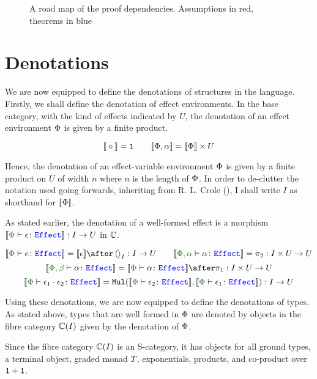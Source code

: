 \documentclass{Report}
\begin{document}
\begin{figure}[h!]
\begin{center}
{
    }
    \end{center}
\caption{A road map of the proof dependencies. Assumptions in red, theorems in blue}
\label{RoadMap}
\end{figure}


\section{Denotations}\label{PECDenotations}
We are now equipped to define the denotations of structures in the language. Firstly, we shall define the denotation of effect environments. In the base category, with the kind of effects indicated by $U$, the denotation of an effect environment $\P$ is given by a finite product.

\[
\deno{\nil} = \1 \quad\quad \deno{\P, \a} = \deno{\P}\times U    
\]

Hence, the denotation of an  effect-variable environment $\P$ is given by a finite product on $U$ of width $n$ where $n$ is the length of $\P$. In order to de-clutter the notation used going forwards, inheriting from R. L. Crole (\cite{crole_1994}), I shall write $I$ as shorthand for $\deno{\P}$.  


As stated earlier, the denotation of a well-formed effect is a morphism $\deno{\typerelation{\P}{\e}{\effect}}: I \rightarrow U$ in $\C$.

\[
    \deno{\typerelation{\P}{e}{\effect}} = \deno{\e} \after \term{I}: I\rightarrow U
    \quad\quad
    \deno{\typerelation{\P,\a}{\a}{\effect}} = \pp: I\times U \rightarrow U
\]\[
    \deno{\typerelation{\P, \b}{\a}{\effect}} = \deno{\typerelation{\P}{\a}{\effect}}\after\p: I\times U\rightarrow U
\]\[
    \deno{\typerelation{\P}{\e_1\dot \e_2}{\effect}} = \Mul(\deno{\typerelation{\P}{\e_2}{\effect}},\deno{\typerelation{\P}{\e_1}{\effect}}): I \rightarrow U
\]

Using these denotations, we are now equipped to define the denotations of types. As stated above, types that are well formed in $\P$ are denoted by objects in the fibre category $\C(I)$ given by the denotation of $\P$.
 
Since the fibre category $\C(I)$ is an S-category, it has objects for all ground types, a terminal object, graded monad $\T{}{}$, exponentials, products, and co-product over $\1+\1$.
\end{document}
